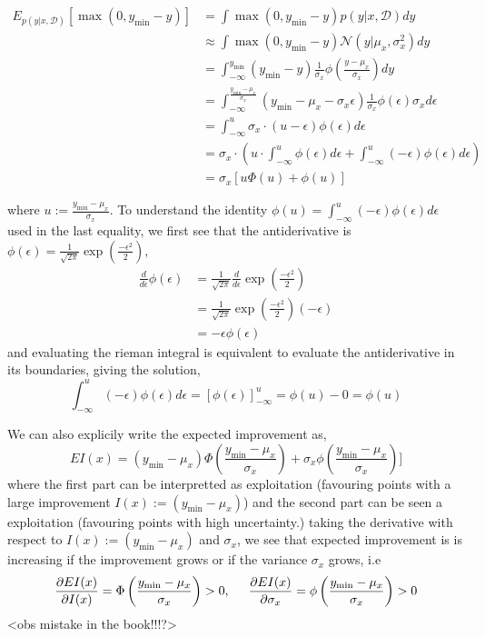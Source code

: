 \begin{align*}
    E_{p(y|x,\mathcal{D})}[\max(0,y_{\min}-y)] &= \int \max(0,y_{\min}-y) p(y|x,\mathcal{D}) dy\\
    &\approx \int \max(0,y_{\min}-y) \mathcal{N}(y|\mu_x, \sigma_x^2) dy\\
    &= \int_{-\infty}^{y_{\min}} (y_{\min}-y) \frac{1}{\sigma_x}\phi\left(\frac{y-\mu_x}{\sigma_x}\right) dy\\
    &= \int_{-\infty}^{\frac{y_{\min}-\mu_x}{\sigma_x}} (y_{\min}-\mu_x-\sigma_x\epsilon) \frac{1}{\sigma_x}\phi\left(\epsilon\right) \sigma_x d\epsilon\\
    &= \int_{-\infty}^u \sigma_x \cdot (u-\epsilon) \phi(\epsilon) d\epsilon\\
    &=  \sigma_x \cdot \left( u\cdot \int_{-\infty}^u \phi(\epsilon) d\epsilon +\int_{-\infty}^u (-\epsilon)  \phi(\epsilon) d\epsilon \right) \\
    &= \sigma_x [u\Phi(u)+ \phi(u)]
\end{align*}

where $u:=\frac{y_{\min}-\mu_x}{\sigma_x}$. To understand the identity $\phi(u) = \int_{-\infty}^u
(-\epsilon)  \phi(\epsilon) d\epsilon$ used in the last equality, we first see that the antiderivative
is $\phi(\epsilon) = \frac{1}{\sqrt{2\pi}} \exp(\frac{-\epsilon^2}{2})$,
\begin{align*}
    \frac{d}{d \epsilon} \phi(\epsilon) &=  \frac{1}{\sqrt{2\pi}}\frac{d}{d \epsilon} \exp(\frac{-\epsilon^2}{2})\\
    &=  \frac{1}{\sqrt{2\pi}}\exp(\frac{-\epsilon^2}{2})(-\epsilon)\\
    &= -\epsilon \phi(\epsilon)
\end{align*}
and evaluating the rieman integral is equivalent to evaluate the antiderivative in its boundaries, giving the 
solution, 
$$\int_{-\infty}^u
(-\epsilon)  \phi(\epsilon) d\epsilon = \left[\phi(\epsilon)\right]_{-\infty}^u = \phi(u)-0 = \phi(u)$$ 

We can also explicily write the expected improvement as, 
$$EI(x) = (y_{\min}-\mu_x)\Phi\left(\frac{y_{\min}-\mu_x}{\sigma_x}\right)+ \sigma_x
\phi\left(\frac{y_{\min}-\mu_x}{\sigma_x}\right)]$$
where the first part can be interpretted as exploitation (favouring points with a large improvement $I(x) := (y_{\min}-\mu_x)$)
and the second part can be seen a exploitation (favouring points with high uncertainty.)
taking the derivative with respect to $I(x) := (y_{\min}-\mu_x)$ and $\sigma_x$, we see that expected improvement is 
is increasing if the improvement grows or if the variance $\sigma_x$ grows, i.e
$$\frac{\partial EI(x)}{\partial I(x)} = \Phi\left(\frac{y_{\min}-\mu_x}{\sigma_x}\right) > 0, \hspace*{0.5cm} 
\frac{\partial EI(x)}{\partial \sigma_x} = \phi\left(\frac{y_{\min}-\mu_x}{\sigma_x}\right) >0$$ 
<obs mistake in the book!!!?>






